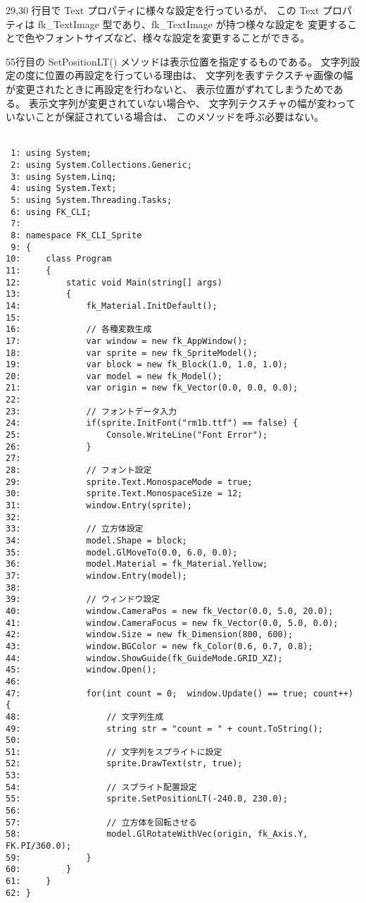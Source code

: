 29,30 行目で Text プロパティに様々な設定を行っているが、
この Text プロパティは fk\_TextImage 型であり、fk\_TextImage が持つ様々な設定を
変更することで色やフォントサイズなど、様々な設定を変更することができる。

55行目の SetPositionLT() メソッドは表示位置を指定するものである。
文字列設定の度に位置の再設定を行っている理由は、
文字列を表すテクスチャ画像の幅が変更されたときに再設定を行わないと、
表示位置がずれてしまうためである。
表示文字列が変更されていない場合や、
文字列テクスチャの幅が変わっていないことが保証されている場合は、
このメソッドを呼ぶ必要はない。\\ ~

\begin{breakbox}
\begin{small}
\begin{verbatim}
 1: using System;
 2: using System.Collections.Generic;
 3: using System.Linq;
 4: using System.Text;
 5: using System.Threading.Tasks;
 6: using FK_CLI;
 7: 
 8: namespace FK_CLI_Sprite
 9: {
10:     class Program
11:     {
12:         static void Main(string[] args)
13:         {
14:             fk_Material.InitDefault();
15: 
16:             // 各種変数生成
17:             var window = new fk_AppWindow();
18:             var sprite = new fk_SpriteModel();
19:             var block = new fk_Block(1.0, 1.0, 1.0);
20:             var model = new fk_Model();
21:             var origin = new fk_Vector(0.0, 0.0, 0.0);
22: 
23:             // フォントデータ入力
24:             if(sprite.InitFont("rm1b.ttf") == false) {
25:                 Console.WriteLine("Font Error");
26:             }
27: 
28:             // フォント設定
29:             sprite.Text.MonospaceMode = true;
30:             sprite.Text.MonospaceSize = 12;
31:             window.Entry(sprite);
32: 
33:             // 立方体設定
34:             model.Shape = block;
35:             model.GlMoveTo(0.0, 6.0, 0.0);
36:             model.Material = fk_Material.Yellow;
37:             window.Entry(model);
38: 
39:             // ウィンドウ設定
40:             window.CameraPos = new fk_Vector(0.0, 5.0, 20.0);
41:             window.CameraFocus = new fk_Vector(0.0, 5.0, 0.0);
42:             window.Size = new fk_Dimension(800, 600);
43:             window.BGColor = new fk_Color(0.6, 0.7, 0.8);
44:             window.ShowGuide(fk_GuideMode.GRID_XZ);
45:             window.Open();
46:  
47:             for(int count = 0;  window.Update() == true; count++) {
48:                 // 文字列生成
49:                 string str = "count = " + count.ToString();
50: 
51:                 // 文字列をスプライトに設定
52:                 sprite.DrawText(str, true);
53: 
54:                 // スプライト配置設定
55:                 sprite.SetPositionLT(-240.0, 230.0);
56: 
57:                 // 立方体を回転させる
58:                 model.GlRotateWithVec(origin, fk_Axis.Y, FK.PI/360.0);
59:             }
60:         }
61:     }
62: }
\end{verbatim}
\end{small}
\end{breakbox}

